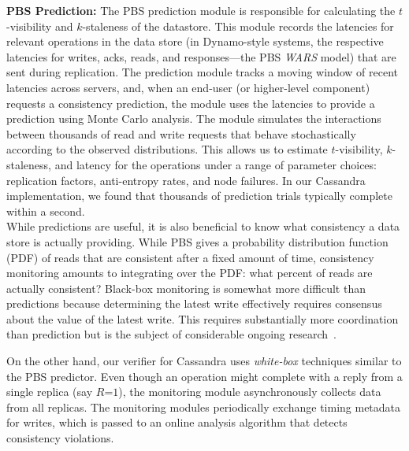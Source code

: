 \noindent\textbf{PBS Prediction:} The PBS prediction module is
responsible for calculating the $t$-visibility and $k$-staleness of
the datastore. This module records the latencies for relevant
operations in the data store (in Dynamo-style systems, the respective
latencies for writes, acks, reads, and responses---the PBS
\textit{WARS} model) that are sent during replication.  The prediction
module tracks a moving window of recent latencies across servers, and,
when an end-user (or higher-level component) requests a consistency
prediction, the module uses the latencies to provide a prediction
using Monte Carlo analysis. The module simulates the interactions
between thousands of read and write requests that behave
stochastically according to the observed distributions. This allows us
to estimate $t$-visibility, $k$-staleness, and latency for the
operations under a range of parameter choices: replication factors,
anti-entropy rates, and node failures. In our Cassandra
implementation, we found that thousands of prediction trials typically
complete within a second.\\

 While predictions are useful, it is
also beneficial to know what consistency a data store is actually providing.
While PBS gives a probability distribution function (PDF) of reads that are
consistent after a fixed amount of time, consistency monitoring amounts to
integrating over the PDF: what percent of reads are actually consistent?
Black-box monitoring is somewhat more difficult than predictions because
determining the latest write effectively requires consensus about the value of
the latest write. This requires substantially more coordination than prediction
but is the subject of considerable ongoing research~\cite{hotdep}. 

On the other hand, our verifier for Cassandra uses \textit{white-box}
techniques similar to the PBS predictor. Even though an operation
might complete with a reply from a single replica (say $R$=$1$), the
monitoring module asynchronously collects data from all replicas. The
monitoring modules periodically exchange timing metadata for writes,
which is passed to an online analysis algorithm that detects
consistency violations.

